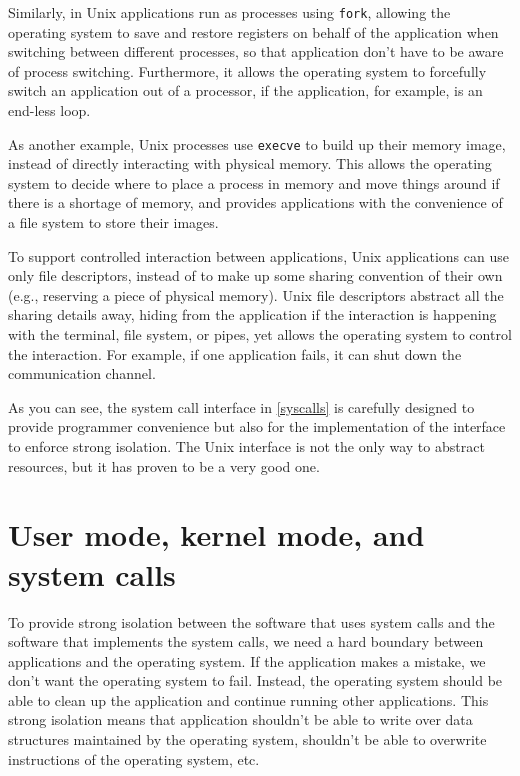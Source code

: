 \documentclass{report}
\begin{document}
	Similarly, in Unix applications run as processes using \texttt{fork}, allowing the operating
	system to save and restore registers on behalf of the application when switching 
	between different processes, so that application don't have to be aware of process 
	switching. Furthermore, it allows the operating system to forcefully switch an application out
	of a processor, if the application, for example, is an end-less loop.
	
	As another example, Unix processes use \texttt{execve} to build up their memory image,
	instead of directly interacting with physical memory. This allows the operating system
	to decide where to place a process in memory and move things around if there is a
	shortage of memory, and provides applications with the convenience of a file system to
	store their images.
	
	To support controlled interaction between applications, Unix applications can use
	only file descriptors, instead of to make up some sharing convention of their own (e.g.,
	reserving a piece of physical memory). Unix file descriptors abstract all the sharing
	details away, hiding from the application if the interaction is happening with the 
	terminal, file system, or pipes, yet allows the operating system to control the interaction.
	For example, if one application fails, it can shut down the communication channel.
	
	As you can see, the system call interface in \figurename{\ref{syscalls}} is carefully designed to
	provide programmer convenience but also for the implementation of the interface to
	enforce strong isolation. The Unix interface is not the only way to abstract resources,
	but it has proven to be a very good one.
	
	\section{User mode, kernel mode, and system calls}
	To provide strong isolation between the software that uses system calls and the
	software that implements the system calls, we need a hard boundary between applications 
	and the operating system. If the application makes a mistake, we don't want the
	operating system to fail. Instead, the operating system should be able to clean up the
	application and continue running other applications. This strong isolation means that
	application shouldn't be able to write over data structures maintained by the operating
	system, shouldn't be able to overwrite instructions of the operating system, etc.
	
\end{document}
